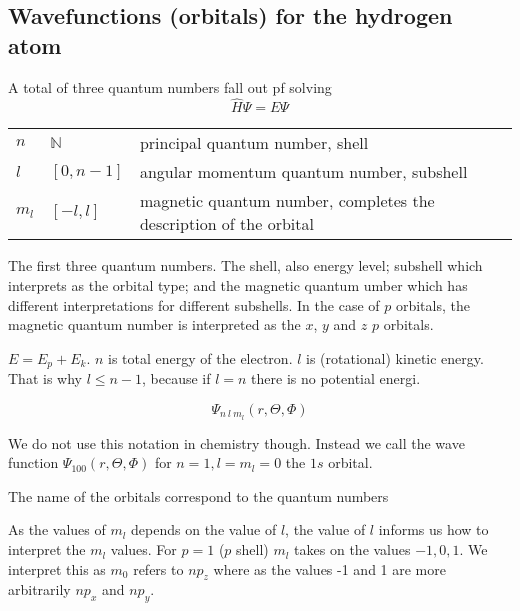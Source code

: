 \documentclass[../mit-general-chemistry.tex]{subfiles}
\begin{document}
\subsection{Wavefunctions (orbitals) for the hydrogen atom}


A total of three quantum numbers fall out pf solving
\begin{equation}
  \hat{H}\Psi = E\Psi
\end{equation}


\begin{htable}
  \begin{center}
    \begin{tabularx}{.67\textwidth}{llX}
      \toprule
      $n$ & $\mathbb{N}$ & principal quantum number, shell \\
      $l$ & $[0, n-1]$ & angular momentum quantum number, subshell \\
      $m_l$ & $[-l, l]$ & magnetic quantum number, completes the
      description of the orbital \\
      \bottomrule
    \end{tabularx}
  \end{center}
  \caption{The first three quantum numbers. The shell, also energy
    level; subshell which interprets as the orbital type; and the
    magnetic quantum umber which has different interpretations for
    different subshells. In the case of $p$ orbitals, the magnetic
    quantum number is interpreted as the $x$, $y$ and $z$ $p$
    orbitals. }
\end{htable}


$E = E_p + E_k$. $n$ is total energy of the electron. $l$ is
(rotational) kinetic energy. That is why $l \leq n - 1$, because if $l
= n$ there is no potential energi.

\begin{equation}
  \Psi_{n~l~m_l}(r, \Theta, \Phi)
\end{equation}

We do not use this notation in chemistry though. Instead we call the
wave function $\Psi_{100}(r, \Theta, \Phi)$ for $n = 1, l = m_l = 0$
the $1s$ orbital.

The name of the orbitals correspond to the quantum numbers

As the values of $m_l$ depends on the value of $l$, the value of $l$
informs us how to interpret the $m_l$ values. For $p = 1$ ($p$ shell) $m_l$ takes
on the values $-1, 0, 1$. We interpret this as $m_0$ refers to $np_z$
where as the values -1 and 1 are more arbitrarily $np_x$ and $np_y$.
\end{document}
